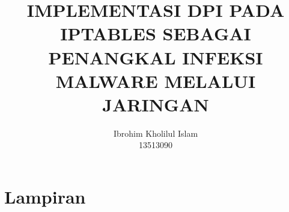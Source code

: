 \documentclass[12pt, a4paper, onecolumn, oneside, final]{report}
\begin{document}
\title{IMPLEMENTASI DPI PADA IPTABLES SEBAGAI PENANGKAL INFEKSI MALWARE MELALUI JARINGAN}
\date{}
\author{Ibrohim Kholilul Islam\\
13513090}

\setcounter{page}{0}



\pagestyle{plain}





\tableofcontents
\listoffigures
\listoftables

\setcounter{page}{0}












\printbibliography

\appendix
{}
\part*{Lampiran}



\end{document}
